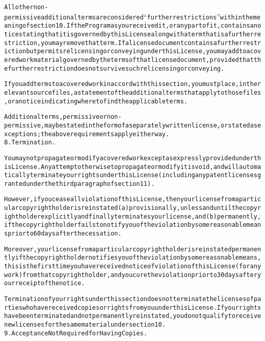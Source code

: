 \begin{alltt}
All other non-permissive additional terms are considered “further restrictions” within the meaning of section 10. If the Program as you received it, or any part of it, contains a notice stating that it is governed by this License along with a term that is a further restriction, you may remove that term. If a license document contains a further restriction but permits relicensing or conveying under this License, you may add to a covered work material governed by the terms of that license document, provided that the further restriction does not survive such relicensing or conveying.

If you add terms to a covered work in accord with this section, you must place, in the relevant source files, a statement of the additional terms that apply to those files, or a notice indicating where to find the applicable terms.

Additional terms, permissive or non-permissive, may be stated in the form of a separately written license, or stated as exceptions; the above requirements apply either way.
8. Termination.

You may not propagate or modify a covered work except as expressly provided under this License. Any attempt otherwise to propagate or modify it is void, and will automatically terminate your rights under this License (including any patent licenses granted under the third paragraph of section 11).

However, if you cease all violation of this License, then your license from a particular copyright holder is reinstated (a) provisionally, unless and until the copyright holder explicitly and finally terminates your license, and (b) permanently, if the copyright holder fails to notify you of the violation by some reasonable means prior to 60 days after the cessation.

Moreover, your license from a particular copyright holder is reinstated permanently if the copyright holder notifies you of the violation by some reasonable means, this is the first time you have received notice of violation of this License (for any work) from that copyright holder, and you cure the violation prior to 30 days after your receipt of the notice.

Termination of your rights under this section does not terminate the licenses of parties who have received copies or rights from you under this License. If your rights have been terminated and not permanently reinstated, you do not qualify to receive new licenses for the same material under section 10.
9. Acceptance Not Required for Having Copies.


\end{alltt}
